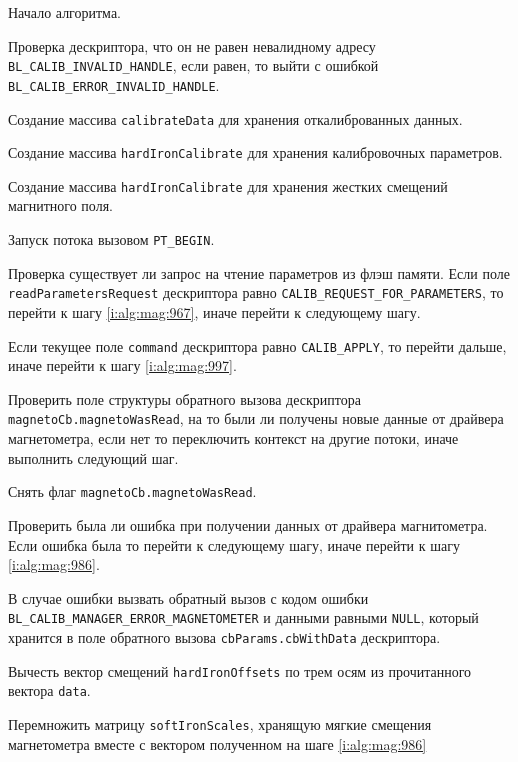 \begin{enumerate_step}
    \item Начало алгоритма.
    \item Проверка дескриптора, что он не равен невалидному адресу \lstinline|BL_CALIB_INVALID_HANDLE|, если равен, то выйти с ошибкой
    \lstinline|BL_CALIB_ERROR_INVALID_HANDLE|.
    \item Создание массива \lstinline|calibrateData| для хранения откалиброванных данных.
    \item Создание массива \lstinline|hardIronCalibrate| для хранения калибровочных параметров.
    \item Создание массива \lstinline|hardIronCalibrate| для хранения жестких смещений магнитного поля.
    \item Запуск потока вызовом \lstinline|PT_BEGIN|.
    \item \label{i:alg:mag:965} Проверка существует ли запрос на чтение параметров из флэш памяти. Если поле \lstinline|readParametersRequest| дескриптора равно \lstinline|CALIB_REQUEST_FOR_PARAMETERS|,
    то перейти к шагу \ref{i:alg:mag:967}, иначе перейти к следующему шагу.
    \item \label{i:alg:mag:974} Если текущее поле \lstinline|command| дескриптора равно \lstinline|CALIB_APPLY|, то перейти дальше, иначе перейти к шагу
    \ref{i:alg:mag:997}.
    \item Проверить поле структуры обратного вызова дескриптора \lstinline|magnetoCb.magnetoWasRead|, на то были ли получены новые данные от драйвера магнетометра, 
    если нет то переключить контекст на другие потоки, иначе выполнить следующий шаг.
    \item Снять флаг \lstinline|magnetoCb.magnetoWasRead|.
    \item Проверить была ли ошибка при получении данных от драйвера магнитометра. Если ошибка была то перейти к следующему шагу, иначе перейти к шагу \ref{i:alg:mag:986}.
    \item В случае ошибки вызвать обратный вызов с кодом ошибки \lstinline|BL_CALIB_MANAGER_ERROR_MAGNETOMETER| и данными равными \lstinline|NULL|,
    который хранится в поле обратного вызова \lstinline|cbParams.cbWithData| дескриптора.
    \item \label{i:alg:mag:986} Вычесть вектор смещений \lstinline|hardIronOffsets| по трем осям из прочитанного вектора \lstinline|data|.
    \item \label{i:alg:mag:991} Перемножить матрицу \lstinline|softIronScales|, хранящую мягкие смещения магнетометра вместе с вектором полученном на шаге \ref{i:alg:mag:986}

\end{enumerate_step}

